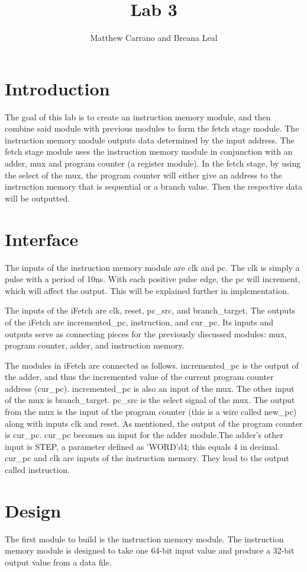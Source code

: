 \documentclass{article}
\author{Matthew Carrano and Breana Leal}
\title{Lab 3}
\begin{document}
\maketitle

\section{Introduction}
The goal of this lab is to create an instruction memory module, and then combine said module with previous modules to form the fetch stage module.  The instruction memory module outputs data determined by the input address. The fetch stage module uses the instruction memory module in conjunction with an adder, mux and program counter (a register module). In the fetch stage, by using the select of the mux, the program counter will either give an address to the instruction memory that is sequential or a branch value. Then the respective data will be outputted.


\section{Interface}
The inputs of the instruction memory module are clk and pc. The clk is simply a pulse with a period of 10ns. With each positive pulse edge, the pc will increment, which will affect the output. This will be explained further in implementation. 

The inputs of the iFetch are clk, reset, pc\_src, and branch\_target. The outputs of the iFetch are incremented\_pc, instruction, and cur\_pc. Its inputs and outputs serve as connecting pieces for the previously discussed modules: mux, program counter, adder, and instruction memory.

The modules in iFetch are connected as follows. incremented\_pc is the output of the adder, and thus the incremented value of the current program counter address (cur\_pc). incremented\_pc is also an input of the mux. The other input of the mux is branch\_target.  pc\_src is the select signal of the mux. The output from the mux is the input of the program counter (this is a wire called new\_pc) along with inputs clk and reset. As mentioned, the output of the program counter is cur\_pc. cur\_pc becomes an input for the adder module.The adder's other input is STEP, a parameter defined as 'WORD'd4; this equals 4 in decimal. cur\_pc and clk are inputs of the instruction memory. They lead to the output called instruction.


\section{Design}
The first module to build is the instruction memory module. The instruction memory module is designed to take one 64-bit input value and produce a 32-bit output value from a data file.
\end{document}
